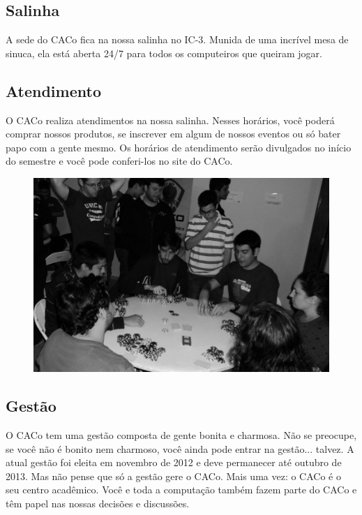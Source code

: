 \subsection{Salinha}

A sede do CACo fica na nossa salinha no IC-3. Munida de uma incrível mesa de
sinuca, ela está aberta 24/7 para todos os computeiros que queiram jogar.

\subsection{Atendimento}

O CACo realiza atendimentos na nossa salinha. Nesses horários, você poderá
comprar nossos produtos, se inscrever em algum de nossos eventos ou só bater
papo com a gente mesmo. Os horários de atendimento serão divulgados no início do
semestre e você pode conferi-los no site do CACo.

\begin{figure}[H]
    \centering
    \includegraphics[scale=0.21]{img/alem_da_graduacao/caco_poker1.jpg}
\end{figure}

\subsection{Gestão}

O CACo tem uma gestão composta de gente bonita e charmosa. Não se preocupe, se
você não é bonito nem charmoso, você ainda pode entrar na gestão... talvez. A
atual gestão foi eleita em novembro de 2012 e deve permanecer até outubro de
2013. Mas não pense que só a gestão gere o CACo. Mais uma vez: o CACo é o seu
centro acadêmico. Você e toda a computação também fazem parte do CACo e têm
papel nas nossas decisões e discussões.

